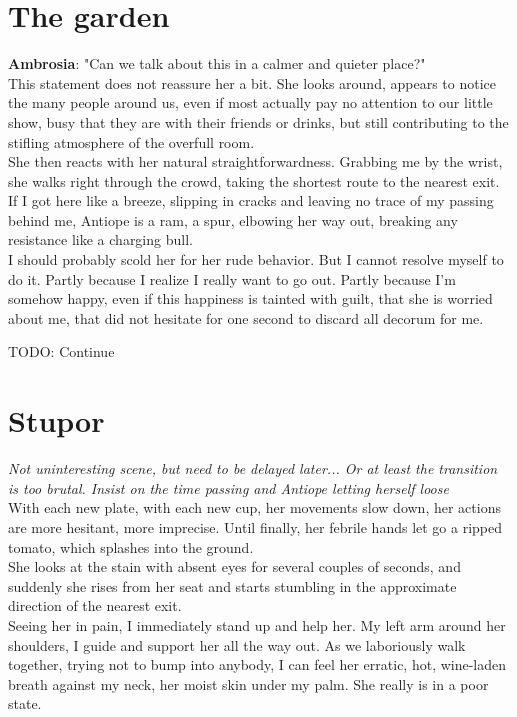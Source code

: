\documentclass{report}
\newcommand{\dcomment}[1]{
	\emph{#1}
	\\
}
\newcommand{\speaker}[1]{
	\textbf{#1}: 
}
\newcommand{\gsection}[1]{
	\section*{#1}
	\label{#1}
}
\begin{document}
\gsection{The garden}

\speaker{Ambrosia} "Can we talk about this in a calmer and quieter place?"\\

This statement does not reassure her a bit. She looks around, appears to notice the many people around us, even if most actually pay no attention to our little show, busy that they are with their friends or drinks, but still contributing to the stifling atmosphere of the overfull room.\\

She then reacts with her natural straightforwardness. Grabbing me by the wrist, she walks right through the crowd, taking the shortest route to the nearest exit. If I got here like a breeze, slipping in cracks and leaving no trace of my passing behind me, Antiope is a ram, a spur, elbowing her way out, breaking any resistance like a charging bull.\\

I should probably scold her for her rude behavior. But I cannot resolve myself to do it. Partly because I realize I really want to go out. Partly because I'm somehow happy, even if this happiness is tainted with guilt, that she is worried about me, that did not hesitate for one second to discard all decorum for me.

TODO: Continue

\gsection{Stupor}

\dcomment{
	Not uninteresting scene, but need to be delayed later... Or at least the transition is too brutal. Insist on the time passing and Antiope letting herself loose
}

With each new plate, with each new cup, her movements slow down, her actions are more hesitant, more imprecise. Until finally, her febrile hands let go a ripped tomato, which splashes into the ground.\\

She looks at the stain with absent eyes for several couples of seconds, and suddenly she rises from her seat and starts stumbling in the approximate direction of the nearest exit.\\

Seeing her in pain, I immediately stand up and help her. My left arm around her shoulders, I guide and support her all the way out. As we laboriously walk together, trying not to bump into anybody, I can feel her erratic, hot, wine-laden breath against my neck, her moist skin under my palm. She really is in a poor state.\\
\end{document}
